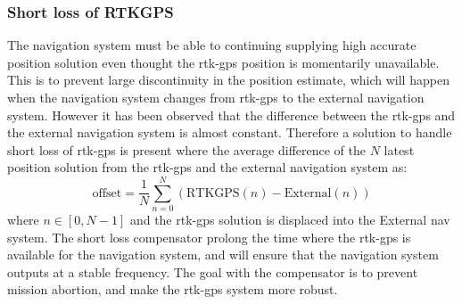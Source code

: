 \subsubsection{Short loss of RTKGPS}\label{ss:ShortLoss}
The navigation  system must be able to continuing supplying high accurate position solution even thought the \gls{rtk-gps} position is momentarily unavailable. This is to prevent large discontinuity in the position estimate, which will happen when the navigation system changes from \gls{rtk-gps} to the external navigation system. However it has been observed that the difference between the \gls{rtk-gps} and the external navigation system is almost constant. Therefore a solution to handle short loss of \gls{rtk-gps} is present where the average difference of the $N$ latest position solution from the \gls{rtk-gps} and the external navigation system as:
\begin{equation}
\text{offset} = \frac{1}{N}\sum_{n=0}^N(\text{RTKGPS}(n)-\text{External}(n))
\end{equation}
where $n \in [0,N-1]$ and the \gls{rtk-gps} solution is displaced into the External nav system. The short loss compensator prolong the time where the \gls{rtk-gps} is available for the navigation system, and will ensure that the navigation system outputs at a stable frequency. The goal with the compensator is to prevent mission abortion, and make the \gls{rtk-gps} system more robust.